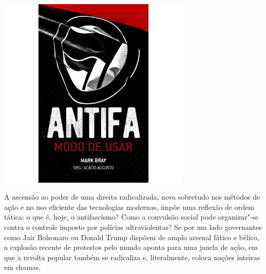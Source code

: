 \hspace*{-.4cm}\begin{minipage}[c]{.5\linewidth}
\small{
{}}
\end{minipage}

\pagebreak

\begin{center}
\hspace*{.5cm}\includegraphics[width=92mm]{./grid/antifa.png}
\end{center}

\hspace*{-7cm}\hrulefill\hspace*{-7cm}

\medskip

\noindent{}A ascensão ao poder de uma direita radicalizada, nova sobretudo nos métodos de ação e no uso eficiente das tecnologias modernas, impõe uma reflexão de ordem tática: o que é, hoje, o antifascismo? Como a convulsão social pode organizar"-se contra o controle imposto por polícias ultraviolentas?
Se por um lado governantes como Jair Bolsonaro ou Donald Trump dispõem de amplo arsenal fático e bélico, a explosão recente de protestos pelo mundo aponta para uma janela de ação, em que a revolta popular também se radicaliza e, literalmente, coloca nações inteiras em chamas.

